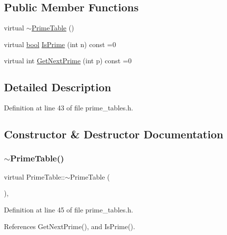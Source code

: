 \subsection*{Public Member Functions}
\begin{DoxyCompactItemize}
\item 
virtual \hyperlink{classPrimeTable_af2cdea4896fd86a42b4dfd5e5027d640}{$\sim$\+Prime\+Table} ()
\item 
virtual \hyperlink{classbool}{bool} \hyperlink{classPrimeTable_a2ab9243364ded0c51541f641b2df362a}{Is\+Prime} (int n) const =0
\item 
virtual int \hyperlink{classPrimeTable_ae537c939f56617d8937d57bbbae3ab30}{Get\+Next\+Prime} (int p) const =0
\end{DoxyCompactItemize}


\subsection{Detailed Description}


Definition at line 43 of file prime\+\_\+tables.\+h.



\subsection{Constructor \& Destructor Documentation}
\mbox{\label{classPrimeTable_af2cdea4896fd86a42b4dfd5e5027d640}} 
\subsubsection{\texorpdfstring{$\sim$\+Prime\+Table()}{~PrimeTable()}}
{\footnotesize\ttfamily virtual Prime\+Table\+::$\sim$\+Prime\+Table (\begin{DoxyParamCaption}{ }\end{DoxyParamCaption})\hspace{0.3cm}{\ttfamily [inline]}, {\ttfamily [virtual]}}



Definition at line 45 of file prime\+\_\+tables.\+h.



References Get\+Next\+Prime(), and Is\+Prime().


